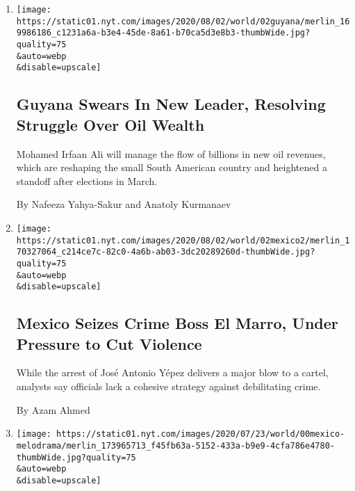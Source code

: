 \begin{enumerate}
\def\labelenumi{\arabic{enumi}.}
\item
  \href{/2020/08/02/world/americas/guyana-president-ali-oil.html}{}

  \texttt{[image: https://static01.nyt.com/images/2020/08/02/world/02guyana/merlin\_169986186\_c1231a6a-b3e4-45de-8a61-b70ca5d3e8b3-thumbWide.jpg?quality=75\\\&auto=webp\\\&disable=upscale]}

  \hypertarget{guyana-swears-in-new-leader-resolving-struggle-over-oil-wealth}{%
  \subsection{Guyana Swears In New Leader, Resolving Struggle Over Oil
  Wealth}\label{guyana-swears-in-new-leader-resolving-struggle-over-oil-wealth}}

  Mohamed Irfaan Ali will manage the flow of billions in new oil
  revenues, which are reshaping the small South American country and
  heightened a standoff after elections in March.

  By Nafeeza Yahya-Sakur and Anatoly Kurmanaev
\item
  \href{/2020/08/02/world/americas/mexico-el-marro-capture.html}{}

  \texttt{[image: https://static01.nyt.com/images/2020/08/02/world/02mexico2/merlin\_170327064\_c214ce7c-82c0-4a6b-ab03-3dc20289260d-thumbWide.jpg?quality=75\\\&auto=webp\\\&disable=upscale]}

  \hypertarget{mexico-seizes-crime-boss-el-marro-under-pressure-to-cut-violence}{%
  \subsection{Mexico Seizes Crime Boss El Marro, Under Pressure to Cut
  Violence}\label{mexico-seizes-crime-boss-el-marro-under-pressure-to-cut-violence}}

  While the arrest of José Antonio Yépez delivers a major blow to a
  cartel, analysts say officials lack a cohesive strategy against
  debilitating crime.

  By Azam Ahmed
\item
  \href{/2020/08/02/world/americas/mexico-tv-virus-telenovela.html}{}

  \texttt{[image: https://static01.nyt.com/images/2020/07/23/world/00mexico-melodrama/merlin\_173965713\_f45fb63a-5152-433a-b9e9-4cfa786e4780-thumbWide.jpg?quality=75\\\&auto=webp\\\&disable=upscale]}


\end{enumerate}
